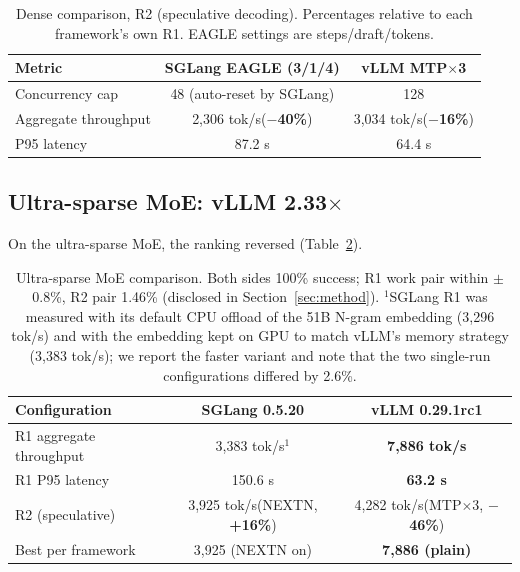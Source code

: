 \documentclass[11pt]{article}
\newcommand{\tps}{tok/s\xspace}
\begin{document}
\begin{table}[t]
\centering
\begin{tabular}{lcc}
\toprule
\textbf{Metric} & \textbf{SGLang EAGLE (3/1/4)} & \textbf{vLLM MTP$\times$3} \\
\midrule
Concurrency cap & 48 (auto-reset by SGLang) & 128 \\
Aggregate throughput & 2,306 \tps (\textbf{$-$40\%}) & 3,034 \tps (\textbf{$-$16\%}) \\
P95 latency & 87.2 s & 64.4 s \\
\bottomrule
\end{tabular}
\caption{Dense comparison, R2 (speculative decoding). Percentages relative to each framework's own R1. EAGLE settings are steps/draft/tokens.}
\label{tab:dense-r2}
\end{table}

\subsection{\texorpdfstring{Ultra-sparse MoE: vLLM 2.33$\times$}{Ultra-sparse MoE: vLLM 2.33x}}
\label{sec:moe}

On the ultra-sparse MoE, the ranking reversed (Table~\ref{tab:moe}).

\begin{table}[t]
\centering
\begin{tabular}{lcc}
\toprule
\textbf{Configuration} & \textbf{SGLang 0.5.20} & \textbf{vLLM 0.29.1rc1} \\
\midrule
R1 aggregate throughput & 3,383 \tps{}$^{1}$ & \textbf{7,886 \tps} \\
R1 P95 latency & 150.6 s & \textbf{63.2 s} \\
R2 (speculative) & 3,925 \tps (NEXTN, \textbf{+16\%}) & 4,282 \tps (MTP$\times$3, \textbf{$-$46\%}) \\
Best per framework & 3,925 (NEXTN on) & \textbf{7,886 (plain)} \\
\bottomrule
\end{tabular}
\caption{Ultra-sparse MoE comparison. Both sides 100\% success; R1 work pair within $\pm$0.8\%, R2 pair 1.46\% (disclosed in Section~\ref{sec:method}). $^{1}$SGLang R1 was measured with its default CPU offload of the 51B N-gram embedding (3,296 \tps) and with the embedding kept on GPU to match vLLM's memory strategy (3,383 \tps); we report the faster variant and note that the two single-run configurations differed by 2.6\%.}
\label{tab:moe}
\end{table}
\end{document}

